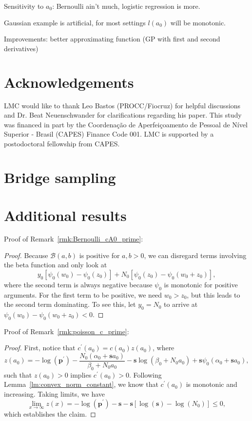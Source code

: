 \documentclass[a4paper, notitlepage, 11pt]{article}
\begin{document}
Sensitivity to $a_0$: Bernoulli ain't much, logistic regression is more.

Gaussian example is artificial, for most settings $l(a_0)$ will be monotonic. 

Improvements: better approximating function (GP with first and second derivatives)

\section*{Acknowledgements}

LMC would like to thank Leo Bastos (PROCC/Fiocruz) for helpful discussions and Dr. Beat Neuenschwander for clarifications regarding his paper.
This study was financed in part by the Coordenação de Aperfeiçoamento de Pessoal de Nível Superior - Brasil (CAPES) Finance Code 001.
LMC is supported by a postodoctoral fellowship from CAPES.



\appendix

\section{Bridge sampling}

\section{Additional results}
\label{sec:further_proofs}

Proof of Remark~\ref{rmk:Bernoulli_cA0_prime}:
\begin{proof}
Because $\mathcal{B}(a, b)$ is positive for $a, b > 0$, we can disregard terms involving the beta function and only look at  
\[  y_0 \left[\psi_0(w_0) - \psi_0(z_0) \right] + N_0 \left[ \psi_0(z_0) - \psi_0(w_0 + z_0) \right],  \]
where the second term is always negative because $\psi_0$ is monotonic for positive arguments.
For the first term to be positive, we need $w_0 > z_0$, but this leads to the second term dominating.
To see this, let $y_0 = N_0$ to arrive at $\psi_0(w_0) - \psi_0(w_0 + z_0) < 0$.
\end{proof}

Proof of Remark~\ref{rmk:poisson_c_prime}:
\begin{proof}
First, notice that $c^\prime(a_0) = c(a_0)z(a_0)$, where
\begin{equation}
 \label{eq:poisson_za0}
 z(a_0) = -\log(\boldsymbol p^\prime) - \frac{N_0 (\alpha_0 + \boldsymbol s a_0) }{\beta_0 + N_0a_0} - \boldsymbol s \log(\beta_0 + N_0a_0) + \boldsymbol s \psi_0(\alpha_0 + \boldsymbol s a_0),
\end{equation}
such that $z(a_0)>0$ implies $c^\prime(a_0) > 0$.
Following Lemma~\ref{lm:convex_norm_constant}, we know that $c^{\prime}(a_0)$ is monotonic and increasing.
Taking limits, we have
\[ \lim_{x \to \infty} z(x) = -\log(\boldsymbol p^\prime) - \boldsymbol s - \boldsymbol s \left[\log(\boldsymbol s) - \log(N_0) \right] \leq 0,  \]
which establishes the claim.
\end{proof}
\end{document}
